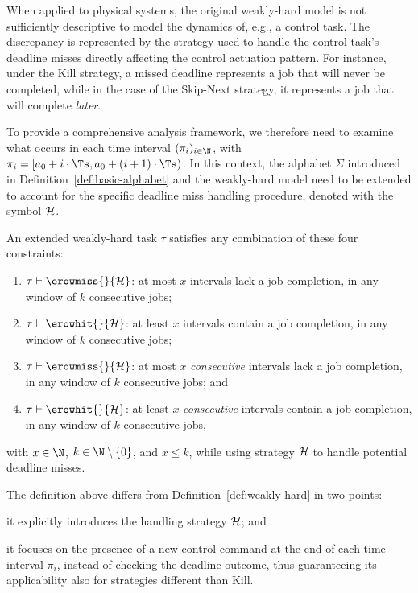 When applied to physical systems, the original weakly-hard model is not sufficiently descriptive to model the dynamics of, e.g., a control task.
The discrepancy is represented by the strategy used to handle the control task's deadline misses directly affecting the control actuation pattern.
For instance, under the Kill strategy, a missed deadline represents a job that will never be completed, while in the case of the Skip-Next strategy, it represents a job that will complete \emph{later}.

To provide a comprehensive analysis framework, we therefore need to examine what occurs in each time interval $(\pi_i)_{i \in \N}$, with $\pi_i = [a_0 + i\cdot \Ts, a_0 + (i+1)\cdot \Ts)$. 
In this context, the alphabet $\Sigma$ introduced in Definition~\ref{def:basic-alphabet} and the weakly-hard model need to be extended to account for the specific deadline miss handling procedure, denoted with the symbol $\mathcal{H}$.

\begin{definition}%
    \label{def:new-mk}%
    An extended weakly-hard task $\tau$ satisfies any combination of these four constraints:
    \begin{enumerate}[label=(\roman*)]
        \item $\tau \vdash \erowmiss{}{\strat}$: at most $x$ intervals lack a job completion, in any window of $k$ consecutive jobs;
        \item $\tau \vdash \erowhit{}{\strat}$: at least $x$ intervals contain a job completion, in any window of $k$ consecutive jobs;
        \item $\tau \vdash \erowmiss{}{\strat}$: at most $x$ \emph{consecutive} intervals lack a job completion, in any window of $k$ consecutive jobs; and
        \item $\tau \vdash \erowhit{}{\strat}$: at least $x$ \emph{consecutive} intervals contain a job completion, in any window of $k$ consecutive jobs,
    \end{enumerate}
    with $x\in \N$, $k \in \N\setminus \left\{ 0 \right\}$, and $x\leq k$, while using strategy $\mathcal{H}$ to handle potential deadline misses.
\end{definition}

The definition above differs from Definition~\ref{def:weakly-hard} in two points:
\begin{enumerate*}[label=(\roman*)]
    \item it explicitly introduces the handling strategy $\mathcal{H}$; and
    \item it focuses on the presence of a new control command at the end of each time interval $\pi_i$, instead of checking the deadline outcome, thus guaranteeing its applicability also for strategies different than Kill.
\end{enumerate*}

